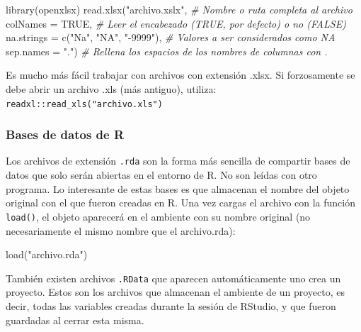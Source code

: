 \documentclass[
]{article}
\newenvironment{Shaded}{\begin{snugshade}}{\end{snugshade}}
\newcommand{\AttributeTok}[1]{\textcolor[rgb]{0.77,0.63,0.00}{#1}}
\newcommand{\CommentTok}[1]{\textcolor[rgb]{0.56,0.35,0.01}{\textit{#1}}}
\newcommand{\ConstantTok}[1]{\textcolor[rgb]{0.00,0.00,0.00}{#1}}
\newcommand{\FunctionTok}[1]{\textcolor[rgb]{0.00,0.00,0.00}{#1}}
\newcommand{\NormalTok}[1]{#1}
\newcommand{\StringTok}[1]{\textcolor[rgb]{0.31,0.60,0.02}{#1}}
\theoremstyle{definition}
\theoremstyle{definition}
\theoremstyle{definition}
\theoremstyle{definition}
\theoremstyle{remark}
\begin{document}
\begin{Shaded}
\begin{Highlighting}[]
\FunctionTok{library}\NormalTok{(openxlsx)}
\FunctionTok{read.xlsx}\NormalTok{(}\StringTok{"archivo.xslx"}\NormalTok{, }\CommentTok{\# Nombre o ruta completa al archivo}
          \AttributeTok{colNames =} \ConstantTok{TRUE}\NormalTok{, }\CommentTok{\# Leer el encabezado (TRUE, por defecto) o no (FALSE)}
          \AttributeTok{na.strings =} \FunctionTok{c}\NormalTok{(}\StringTok{"Na"}\NormalTok{, }\StringTok{"NA"}\NormalTok{, }\StringTok{"{-}9999"}\NormalTok{), }\CommentTok{\# Valores a ser considerados como NA}
          \AttributeTok{sep.names =} \StringTok{"."}\NormalTok{) }\CommentTok{\# Rellena los espacios de los nombres de columnas con .}
\end{Highlighting}
\end{Shaded}

\begin{rmdnote}
Es mucho más fácil trabajar con archivos con extensión .xlsx. Si forzosamente se debe abrir un archivo .xls (más antiguo), utiliza: \texttt{readxl::read\_xls("archivo.xls")}
\end{rmdnote}

\hypertarget{bases-de-datos-de-r}{%
\subsubsection{Bases de datos de R}\label{bases-de-datos-de-r}}

Los archivos de extensión \texttt{.rda} son la forma más sencilla de compartir bases de datos que solo serán abiertas en el entorno de R. No son leídas con otro programa. Lo interesante de estas bases es que almacenan el nombre del objeto original con el que fueron creadas en R. Una vez cargas el archivo con la función \texttt{load()}, el objeto aparecerá en el ambiente con su nombre original (no necesariamente el mismo nombre que el archivo.rda):

\begin{Shaded}
\begin{Highlighting}[]
\FunctionTok{load}\NormalTok{(}\StringTok{"archivo.rda"}\NormalTok{)}
\end{Highlighting}
\end{Shaded}

\begin{rmdtip}
También existen archivos \texttt{.RData} que aparecen automáticamente uno crea un proyecto. Estos son los archivos que almacenan el ambiente de un proyecto, es decir, todas las variables creadas durante la sesión de RStudio, y que fueron guardadas al cerrar esta misma.
\end{rmdtip}
\end{document}
